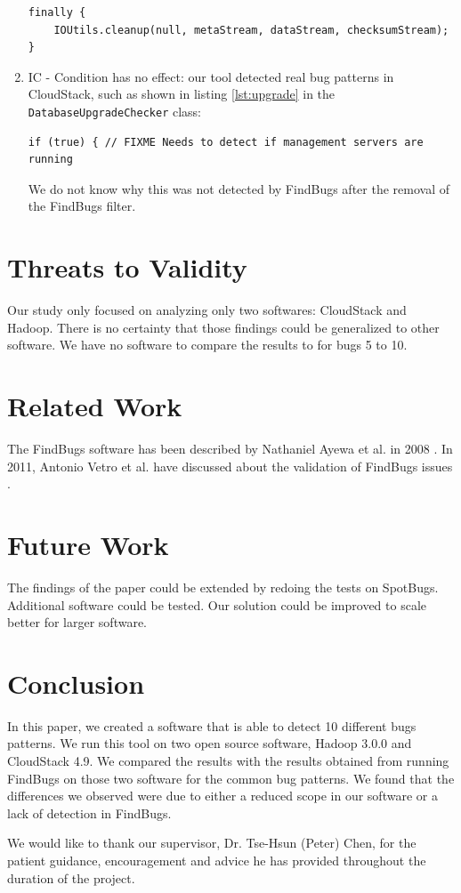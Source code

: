\documentclass[sigconf]{acmart}
\begin{document}
\begin{enumerate}
\begin{lstlisting}[caption={Excerpt from the \texttt{DebugAdmin} class, method \texttt{run} in the Hadoop HDFS project},captionpos=b,label={lst:openstream}]
finally {
    IOUtils.cleanup(null, metaStream, dataStream, checksumStream);
}
\end{lstlisting}
\vspace{-3mm}
    \item IC - Condition has no effect: our tool detected real bug patterns in CloudStack, such as shown in listing \ref{lst:upgrade} in the \texttt{DatabaseUpgradeChecker} class:
\begin{lstlisting}[caption={Excerpt from the \texttt{DatabaseUpgradeChecker} class, method \texttt{upgrade} in the upgrade CloudStack package},captionpos=b,label={lst:upgrade}]
if (true) { // FIXME Needs to detect if management servers are running
\end{lstlisting}
\vspace{-3mm}
We do not know why this was not detected by FindBugs after the removal of the FindBugs filter.
\end{enumerate}

\section{Threats to Validity}
Our study only focused on analyzing only two softwares: CloudStack and Hadoop. There is no certainty that those findings could be generalized to other software. We have no software to compare the results to for bugs 5 to 10.

\section{Related Work}
The FindBugs software has been described by Nathaniel Ayewa et al. in 2008 \cite{ayewah}. In 2011, Antonio Vetro et al. have discussed about the validation of FindBugs issues \cite{vetro_morisio_torchiano_2011}.

\section{Future Work}
The findings of the paper could be extended by redoing the tests on SpotBugs. Additional software could be tested. Our solution could be improved to scale better for larger software.

\section{Conclusion}
In this paper, we created a software that is able to detect 10 different bugs patterns. We run this tool on two open source software, Hadoop 3.0.0 and CloudStack 4.9. We compared the results with the results obtained from running FindBugs on those two software for the common bug patterns. We found that the differences we observed were due to either a reduced scope in our software or a lack of detection in FindBugs.

\begin{acks}
We would like to thank our supervisor, Dr. Tse-Hsun (Peter) Chen, for the patient guidance, encouragement and advice he has provided throughout the duration of the project.
\end{acks}



\end{document}
